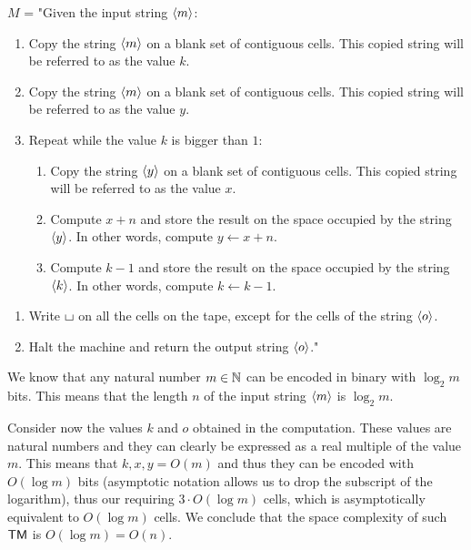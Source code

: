$M$ = "Given the input string $\left\langle m\right\rangle$:
    \begin{enumerate}
        \item Copy the string $\left\langle m\right\rangle$ on a blank set of contiguous cells. This copied string will be referred to as the value $k$.
        \item Copy the string $\left\langle m\right\rangle$ on a blank set of contiguous cells. This copied string will be referred to as the value $y$.
        \item Repeat while the value $k$ is bigger than $1$:
        \begin{enumerate}[label={\arabic*.}, start=3]
            \item Copy the string $\left\langle y\right\rangle$ on a blank set of contiguous cells. This copied string will be referred to as the value $x$.
            \item Compute $x + n$ and store the result on the space occupied by the string $\left\langle y\right\rangle$. In other words, compute $y \gets x + n$.
            \item Compute $k - 1$ and store the result on the space occupied by the string $\left\langle k\right\rangle$. In other words, compute $k \gets k - 1$.
        \end{enumerate}
    \end{enumerate}
    \begin{enumerate}[label={\arabic*.}, start=6]
        \item Write $\blankchar$ on all the cells on the tape, except for the cells of the string $\left\langle o\right\rangle$.
        \item Halt the machine and return the output string $\left\langle o\right\rangle$."
    \end{enumerate}

    We know that any natural number $m \in \mathbb{N}$ can be encoded in binary with $\log_2 m$ bits. This means that the length $n$ of the input string $\left\langle m\right\rangle$ is $\log_2 m$.
    
    Consider now the values $k$ and $o$ obtained in the computation. These values are natural numbers and they can clearly be expressed as a real multiple of the value $m$. This means that $k, x, y = O(m)$ and thus they can be encoded with $O(\log m)$ bits (asymptotic notation allows us to drop the subscript of the logarithm), thus our requiring $3 \cdot O(\log m)$ cells, which is asymptotically equivalent to $O(\log m)$ cells. We conclude that the space complexity of such $\textsf{TM}$ is $O(\log m) = O(n)$.

